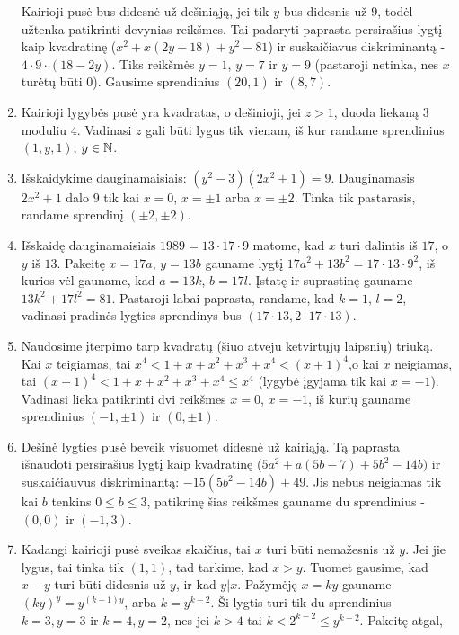 \begin{enumerate}
    Kairioji pusė bus didesnė už dešiniąją, jei tik $y$ bus didesnis už
    $9$, todėl užtenka patikrinti devynias reikšmes. Tai padaryti paprasta
    persirašius lygtį kaip kvadratinę ($x^2 + x(2y-18) + y^2 - 81$) ir
    suskaičiavus diskriminantą - $4\cdot 9\cdot (18-2y)$. Tiks reikšmės
    $y=1$, $y=7$ ir $y=9$ (pastaroji netinka, nes $x$ turėtų būti
    $0$). Gausime sprendinius $(20,1)$ ir $(8,7)$. 
\item
    Kairioji lygybės pusė yra kvadratas, o dešinioji, jei $z>1$, duoda
    liekaną $3$ moduliu $4$. Vadinasi $z$ gali būti lygus tik vienam, iš
    kur randame sprendinius $(1,y,1)$, $y \in \mathbb N$.
\item
    Išskaidykime dauginamaisiais: $(y^2 - 3)(2x^2 + 1)=9$. Dauginamasis
    $2x^2 + 1$ dalo $9$ tik kai $x=0$, $x=\pm 1$ arba $x=\pm 2$. Tinka tik
    pastarasis, randame sprendinį $(\pm 2, \pm 2)$.
\item
    Išskaidę dauginamaisiais $1989 = 13\cdot17\cdot9$ matome, kad $x$ turi
    dalintis iš $17$, o $y$ iš $13$. Pakeitę $x=17a$, $y=13b$ gauname
    lygtį $17a^2 + 13b^2 = 17\cdot13\cdot 9^2$, iš kurios vėl gauname, kad
    $a=13k$, $b=17l$. Įstatę ir suprastinę gauname $13k^2 + 17l^2 = 81$.
    Pastaroji labai paprasta, randame, kad $k=1$, $l=2$, vadinasi pradinės
    lygties sprendinys bus $(17\cdot13, 2\cdot 17\cdot 13)$.
\item
    Naudosime įterpimo tarp kvadratų (šiuo atveju ketvirtųjų laipsnių)
    triuką. Kai $x$ teigiamas, tai $x^4<1+x+x^2+x^3+x^4<(x+1)^4$,o kai
    $x$ neigiamas, tai $(x+1)^4<1+x+x^2+x^3+x^4\leq x^4$ (lygybė įgyjama
    tik kai $x=-1$). Vadinasi lieka patikrinti dvi reikšmes $x=0$,
    $x=-1$, iš kurių gauname sprendinius $(-1, \pm 1)$ ir $(0, \pm 1)$.
\item
    Dešinė lygties pusė beveik visuomet didesnė už kairiąją. Tą paprasta
    išnaudoti persirašius lygtį kaip kvadratinę ($5a^2 + a(5b-7)
    +5b^2-14b)$ ir suskaičiauvus diskriminantą: $-15(5b^2-14b) +49.$ Jis
    nebus neigiamas tik kai $b$ tenkins $0\leq b \leq 3$, patikrinę šias
    reikšmes gauname du sprendinius - $(0,0)$ ir $(-1, 3)$.
\item
    Kadangi kairioji pusė sveikas skaičius, tai $x$ turi būti nemažesnis
    už $y$. Jei jie lygus, tai tinka tik $(1,1)$, tad tarkime, kad
    $x>y$. Tuomet gausime, kad $x-y$ turi būti didesnis už $y$, ir kad
    $y|x$. Pažymėję $x=ky$ gauname $(ky)^{y} = y^{(k-1)y}$, arba
    $k = y^{k-2}$. Ši lygtis turi tik du sprendinius $k=3,y=3$ ir
    $k=4, y=2$, nes jei $k>4$ tai $k<2^{k-2}\leq y^{k-2}$. Pakeitę atgal,

\end{enumerate}
